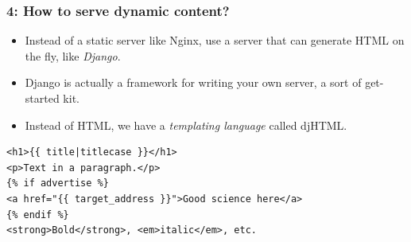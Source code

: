 \documentclass{beamer}
\begin{document}
\begin{frame}[fragile]
  \frametitle{4: How to serve dynamic content?}

  \begin{itemize}
  \item Instead of a static server like Nginx, use a server
    that can generate HTML on the fly, like \emph{Django}.
  \item Django is actually a framework for writing your own server, a
    sort of get-started kit.
  \item Instead of HTML, we have a \emph{templating language} called
    djHTML.
  \end{itemize}

  \begin{lstlisting}[basicstyle=\ttfamily]
<h1>{{ title|titlecase }}</h1>
<p>Text in a paragraph.</p>
{% if advertise %}
<a href="{{ target_address }}">Good science here</a>
{% endif %}
<strong>Bold</strong>, <em>italic</em>, etc.
  \end{lstlisting}
\end{frame}
\end{document}
